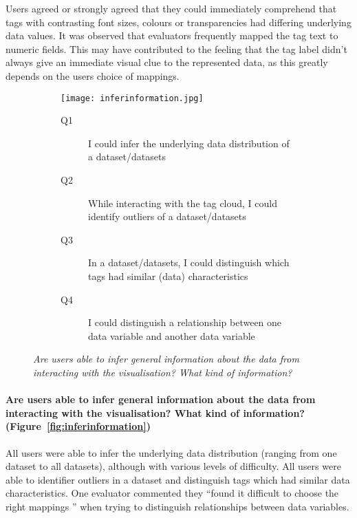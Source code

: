 Users agreed or strongly agreed that they could immediately comprehend that tags with contrasting font sizes, colours or transparencies had differing underlying data values. It was observed that evaluators frequently mapped the tag text to numeric fields. This may have contributed to the feeling that the tag label didn't always give an immediate visual clue to the represented data, as this greatly depends on the users choice of mappings.

\begin{figure}[!htb]
\centering
\begin{subfigure}{\textwidth}
	\centering
	\texttt{[image: inferinformation.jpg]}
\end{subfigure}
\begin{subfigure}{\textwidth}
  \begin{description}
	\item[Q1]I could infer the underlying data distribution of a dataset/datasets 
	\item[Q2]While interacting with the tag cloud, I could identify outliers of a dataset/datasets
	\item[Q3]In a dataset/datasets, I could distinguish which tags had similar (data) characteristics
	\item[Q4]I could distinguish a relationship between one data variable and another data variable
  \end{description}
\end{subfigure}
\caption{\textit{Are users able to infer general information about the data from interacting with the visualisation? What kind of information?}}
\label{fig:inferinformation}
\end{figure}

\paragraph{Are users able to infer general information about the data from interacting with the visualisation? What kind of information? (Figure~\vref{fig:inferinformation})}

All users were able to infer the underlying data distribution (ranging from one dataset to all datasets), although with various levels of difficulty. All users were able to identifier outliers in a dataset and distinguish tags which had similar data characteristics. One evaluator commented they “found it difficult to choose the right mappings ” when trying to distinguish relationships between data variables.

